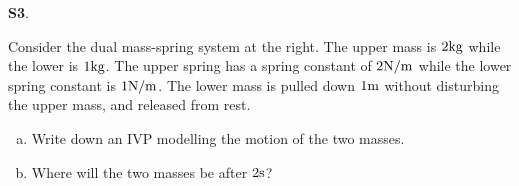 \documentclass{article}
\newenvironment{problem}[1]
{
  \begin{flushleft}
  \textbf{#1}.
  \ignorespaces
}
{
  \end{flushleft}
}
\begin{document}
\begin{problem}{S3}
\begin{minipage}[t]{0.8\linewidth}
Consider the dual mass-spring system at the right.  The upper mass is \(2 {\rm kg}\) while the lower is \(1 {\rm kg}\).  The upper spring has a spring constant of \( 2 {\rm N/m}\) while the lower spring constant is \(1 {\rm N/m}\).  The lower mass is pulled down \(1 {\rm m}\) without disturbing the upper mass, and released from rest. 
\begin{enumerate}[(a)]
\item Write down an IVP modelling the motion of the two masses.
\item Where will the two masses be after \(2 {\rm s}\)?
\end{enumerate}
\end{minipage}
\hfill
\springdoublemassQuiz[0.7]
\hfill
\end{problem}
\end{document}
